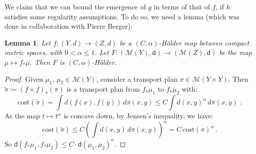 \documentclass[11pt,reqno]{amsart}
\theoremstyle{plain}
\newtheorem{lemma}[theorem]{Lemma}
\theoremstyle{definition}
\theoremstyle{remark}
\theoremstyle{plain}
\numberwithin{equation}{section}
\newcommand{\M}{\mathcal{M}}
\begin{document}
We claim that we can bound the emergence of $g$ in terms of that of $f$, if  $h$ satisfies some regularity assumptions. To do so, we need a lemma (which was done in collaboration with Pierre Berger):

\begin{lemma}\label{l:push_Holder}
	Let $f \colon (Y,d) \to (Z,d)$ be a $(C,\alpha)$-H\"older map between compact metric spaces, with $0< \alpha\leq 1$.
	Let $F \colon (\M(Y),\mathsf{d}) \to (\M(Z),\mathsf{d})$ be the map $\mu \mapsto f_{\ast}\mu$.
	Then $F$ is $(C,\alpha)$-H\"older.
\end{lemma}
\begin{proof}
	Given $\mu_1$, $\mu_2 \in \M(Y)$, consider a transport plan $\pi \in \M(Y \times Y)$.
	Then $\tilde \pi \coloneqq (f \times f)_{\ast}(\pi)$ is a transport plan from $f_{\ast}\mu_1$ to $f_{\ast}\mu_2$ with:
	$$
	\mathrm{cost}(\tilde \pi) = \int d(f(x),f(y))\, d\pi(x,y) \le C \int d(x,y)^\alpha \, d\pi(x,y)\; .
	$$
	As the map $t\mapsto t^\alpha$ is concave down, by Jensen's inequality, we have:
	$$
	\mathrm{cost}(\tilde \pi) \le  C \left(\int d(x,y)\, d\pi(x,y)\right)^\alpha 
	= C \, \mathrm{cost}(\pi)^\alpha \, .
	$$
	So $\mathsf{d}(f_{\ast}\mu_1 , f_{\ast}\mu_2) \le C \cdot \mathsf{d}(\mu_1 , \mu_2)^\alpha$.
\end{proof}
						
\end{document}
